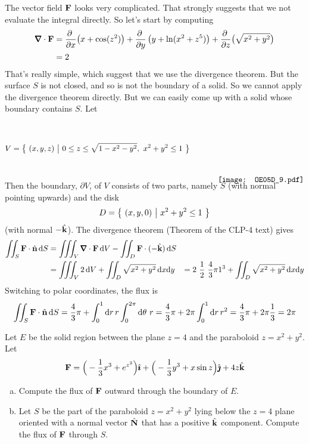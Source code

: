 \begin{solution}
The vector field $\mathbf{F}$ looks very complicated. 
That strongly suggests that we not evaluate the integral directly.
So let's start by computing
\begin{align*}
\vnabla\cdot\vF &= 
    \pdiff{}{x}\big(x + \cos(z^2)\big)
     +\pdiff{}{y}\left(y + \ln(x^2 + z^5)\right)
     +\pdiff{}{z}\big(\sqrt{x^2 + y^2}\big) \\
   &=   2
\end{align*}
That's really simple, which suggest that we use the divergence theorem.
But the surface $S$ is not closed, and so is not the boundary of a solid.
So we cannot apply the divergence theorem directly. But we can easily
come up with a solid whose boundary contains $S$. Let
\begin{equation*}
V=\Set{(x,y,z)}{0\le z\le \sqrt{1-x^2-y^2},\ x^2+y^2\le 1}
    \hskip0.5in\raisebox{-40pt}[40pt][30pt]
                         {\texttt{[image: OE05D\_9.pdf]}}
\end{equation*}
Then the boundary, $\partial V$, of $V$ consists of two parts, namely $S$
(with normal pointing upwards) and the disk
\begin{equation*}
D=\big\{ \ (x,y,0)\ \big|\ x^2+y^2\le 1\ \big\}
\end{equation*}
(with normal $-\hat{\mathbf{k}}$).  The divergence theorem 
(Theorem  of the CLP-4 text) gives
\begin{align*}
\dblInt_S \vF \cdot \hn\,\dee{S}
&=\tripInt_V \vnabla\cdot\vF\,\dee{V}
    -\dblInt_D \vF \cdot (-\hk)\,\dee{S} \\
&=\tripInt_V 2\,\dee{V}
  +\dblInt_D \sqrt{x^2+y^2}\,\dee{x}\dee{y} 
&=2\ \frac{1}{2}\ \frac{4}{3}\pi 1^3
  +\dblInt_D \sqrt{x^2+y^2}\,\dee{x}\dee{y} 
\end{align*}
Switching to polar coordinates, the flux is
\begin{align*}
\iint_S \mathbf{F}\cdot\hat{\mathbf{n}}\,\mathrm{d}S
=\frac{4}{3}\pi+\int_0^1\mathrm{d}r\,r\int_0^{2\pi}\mathrm{d}\theta\ r
=\frac{4}{3}\pi + 2\pi \int_0^1 \mathrm{d}r\, r^2
=\frac{4}{3}\pi + 2\pi \frac{1}{3}
=2\pi
\end{align*}

\end{solution}

\begin{question}\label{prb_flux_surface}
Let $E$ be the solid region between the plane $z = 4$ and the paraboloid 
$z = x^2 + y^2$. Let
\begin{equation*}
\mathbf{F} = \Big(-\frac{1}{3}x^3 + e^{z^2}\Big)\hat{\pmb{\imath}} 
     + \Big(-\frac{1}{3}y^3 + x\sin z\Big)\hat{\pmb{\jmath}} + 4z\hat{\mathbf{k}}
\end{equation*}
\begin{enumerate}[(a)]
\item
Compute the flux of $\mathbf{F}$ outward through the boundary of $E$.

\item
Let $S$ be the part of the paraboloid $z = x^2 + y^2$ lying below the 
$z = 4$ plane oriented with a normal vector $\hat{\mathbf{N}}$ that has a positive $\hat{\mathbf{k}}$ component. 
Compute the flux of $\mathbf{F}$ through $S$.
\end{enumerate}

\end{question}

